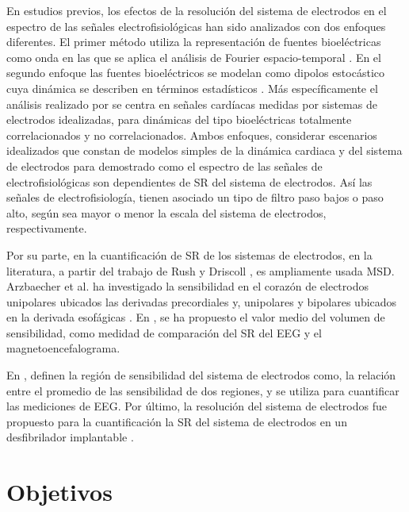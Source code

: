 En estudios previos, los efectos  de la resolución del sistema de electrodos en
el espectro de las señales electrofisiológicas han sido analizados con dos
enfoques diferentes. El primer método utiliza la representación de fuentes
bioeléctricas como onda en las que se aplica el análisis de Fourier
espacio-temporal \cite{Nunez95, NunezSrinivasan06b}.
En el segundo enfoque las fuentes bioeléctricos se modelan como dipolos
estocástico cuya dinámica se describen en términos estadísticos \cite{Requena08}.
Más específicamente el análisis realizado por \cite{Requena08} se
centra en señales cardíacas medidas por sistemas de electrodos idealizadas, para
dinámicas del tipo bioeléctricas totalmente correlacionados y no correlacionados.
Ambos enfoques, considerar escenarios idealizados que constan de
modelos simples de la dinámica cardiaca y del sistema de electrodos para
demostrado como el espectro de las señales de electrofisiológicas son
dependientes de \ac{SR} del sistema de electrodos. Así las señales
de electrofisiología, tienen asociado un tipo de filtro paso bajos o paso alto,
según sea mayor o menor la escala del sistema de electrodos, respectivamente.


Por su parte, en la cuantificación de \ac{SR} de los
sistemas de electrodos, en la literatura, a partir del trabajo de Rush y
Driscoll \cite{Rush69}, es ampliamente usada \ac{MSD}.
Arzbaecher et al. ha investigado la sensibilidad en el corazón
de electrodos unipolares ubicados las derivadas precordiales y, unipolares y
bipolares ubicados en la derivada esofágicas \cite{Arzbaecher79}. En
\cite{Malmivuo97}, se ha propuesto el valor medio del volumen de  sensibilidad,
como medidad de comparación del \ac{SR} del \ac{EEG} y el magnetoencefalograma.

En \cite{Vaisanen08}, definen la región de sensibilidad del sistema de
electrodos  como, la relación entre el promedio de las sensibilidad de dos
regiones, y se utiliza para cuantificar las mediciones de \ac{EEG}.  Por
último, la resolución del sistema de electrodos fue propuesto para la
cuantificación la SR del sistema de electrodos en un desfibrilador implantable
\cite{Requena09}.


\section{Objetivos}

